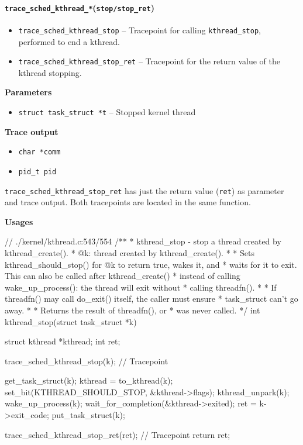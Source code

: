 \paragraph{\texttt{trace\_sched\_kthread\_*}(\texttt{stop/stop\_ret})}
\begin{itemize}
    \item \texttt{trace\_sched\_kthread\_stop} -- Tracepoint for calling \verb|kthread_stop|, performed to end a kthread.
    \item \texttt{trace\_sched\_kthread\_stop\_ret} -- Tracepoint for the return value of the kthread stopping.
\end{itemize}

\textbf{Parameters}
\begin{itemize}
    \item \verb|struct task_struct *t| -- Stopped kernel thread
\end{itemize}

\textbf{Trace output}
\begin{itemize}
    \item \verb|char *comm|
    \item \verb|pid_t pid|
\end{itemize}

\texttt{trace\_sched\_kthread\_stop\_ret} has just the return value (\verb|ret|) as parameter and trace output. Both tracepoints are located in the same function.

\textbf{Usages}
\begin{code}
// ./kernel/kthread.c:543/554
/**
 * kthread_stop - stop a thread created by kthread_create().
 * @k: thread created by kthread_create().
 *
 * Sets kthread_should_stop() for @k to return true, wakes it, and
 * waits for it to exit. This can also be called after kthread_create()
 * instead of calling wake_up_process(): the thread will exit without
 * calling threadfn().
 *
 * If threadfn() may call do_exit() itself, the caller must ensure
 * task_struct can't go away.
 *
 * Returns the result of threadfn(), or %
 * was never called.
 */
int kthread_stop(struct task_struct *k){
	struct kthread *kthread;
	int ret;

	trace_sched_kthread_stop(k); // Tracepoint

	get_task_struct(k);
	kthread = to_kthread(k);
	set_bit(KTHREAD_SHOULD_STOP, &kthread->flags);
	kthread_unpark(k);
	wake_up_process(k);
	wait_for_completion(&kthread->exited);
	ret = k->exit_code;
	put_task_struct(k);

	trace_sched_kthread_stop_ret(ret); // Tracepoint
	return ret;
}
\end{code}